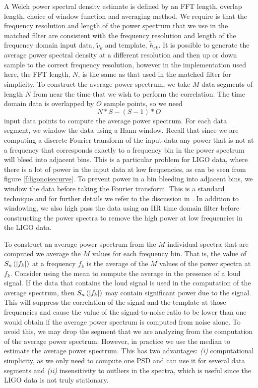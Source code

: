 A Welch power spectral density estimate is defined by an FFT length, overlap
length, choice of window function and averaging method. We require is that the
frequency resolution and length of the power spectrum that we use in the
matched filter are consistent with the frequency resolution and length of the
frequency domain input data, $\tilde{v}_k$ and template, $\tilde{h}_{ck}$. It
is possible to generate the average power spectral density at a different
resolution and then up or down sample to the correct frequency resolution,
however in the implementation used here, the FFT length, $N$, is the same as
that used in the matched filter for simplicity.  To construct the average
power spectrum, we take $M$ data segments of length $N$ from near the time
that we wish to perform the correlation. The time domain data is overlapped
by $O$ sample points, so we need
\begin{equation}
N * S - ( S - 1 ) * O
\end{equation}
input data points to compute the average power spectrum. For each data
segment, we window the data using a Hann window. Recall that since we are
computing a discrete Fourier transform of the input data any power that is not
at a frequency that corresponds exactly to a frequency bin in the power
spectrum will bleed into adjacent bins. This is a particular problem for LIGO
data, where there is a lot of power in the input data at low frequencies, as
can be seen from figure \ref{f:ligonoisecurve}. To prevent power in a
bin bleeding into adjacent bins, we window the data before taking the Fourier
transform. This is a standard technique and for further details we refer to the
discussion in \cite{numrec}. In addition to windowing, we also high pass the
data using an IIR time domain filter before constructing the power spectra to
remove the high power at low frequencies in the LIGO data.

To construct an average power spectrum from the $M$ individual spectra that
are computed we average the $M$ values for each frequency bin. That is, the
value of $S_n\left(\left|f_{k}\right|\right)$ at a frequency $f_k$ is the average of the $M$ values of
the power spectra at $f_k$. Consider using the mean to compute the average in
the presence of a loud signal. If the data that contains the loud signal is
used in the computation of the average spectrum, then $S_n\left(\left|f_{k}\right|\right)$ may contain
significant power due to the signal. This will suppress the correlation of the
signal and the template at those frequencies and cause the value of the
signal-to-noise ratio to be lower than one would obtain if the average power
spectrum is computed from noise alone. To avoid this, we may drop the segment
that we are analyzing from the computation of the average power spectrum. 
However, in practice we use the median to estimate the average power
spectrum. This has two advantages: \emph{(i)} computational simplicity, as we
only need to compute one PSD and can use it for several data segments and
\emph{(ii)} insensitivity to outliers in the spectra, which is useful since the
LIGO data is not truly stationary.

